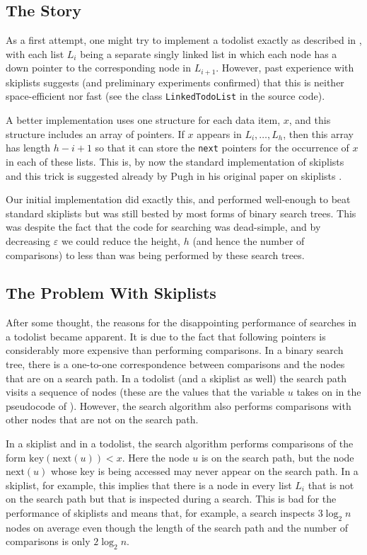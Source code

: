 \documentclass[lotsofwhite]{patmorin}
\newcommand{\eps}{\varepsilon}
\begin{document}
\subsection{The Story}

As a first attempt, one might try to implement a todolist exactly
as described in , with each list $L_i$ being a
separate singly linked list in which each node has a down pointer to
the corresponding node in $L_{i+1}$.  However, past experience with
skiplists suggests (and preliminary experiments confirmed) that this is
neither space-efficient nor fast (see the class \texttt{LinkedTodoList}
in the source code).

A better implementation uses one structure for each data item, $x$,
and this structure includes an array of pointers.  If $x$ appears in
$L_{i},\ldots,L_h$, then this array has length $h-i+1$ so that it can
store the \texttt{next} pointers for the occurrence of $x$ in each of
these lists.  This is, by now the standard implementation of skiplists
and this trick is suggested already by Pugh in his original paper on
skiplists \cite{pXX}.

Our initial implementation did exactly this, and performed well-enough
to beat standard skiplists but was still bested by most forms of binary
search trees.  This was despite the fact that the code for searching was
dead-simple, and by decreasing $\eps$ we could reduce the height, $h$
(and hence the number of comparisons) to less than was being performed
by these search trees.

\subsection{The Problem With Skiplists}

After some thought, the reasons for the disappointing performance
of searches in a todolist became apparent.  It is due to the
fact that following pointers is considerably more expensive than
performing comparisons.  In a binary search tree, there is a one-to-one
correspondence between comparisons and the nodes that are on a search
path.  In a todolist (and a skiplist as well) the search path visits a
sequence of nodes (these are the values that the variable $u$ takes on
in the pseudocode of ).  However, the search
algorithm also performs comparisons with other nodes that are not on
the search path.

In a skiplist and in a todolist, the search algorithm performs comparisons
of the form $\mathrm{key}(\mathrm{next}(u)) < x$.  Here the node $u$
is on the search path, but the node $\mathrm{next}(u)$ whose key is
being accessed may never appear on the search path.  In a skiplist,
for example, this implies that there is a node in every list $L_i$
that is not on the search path but that is inspected during a search.
This is bad for the performance of skiplists and means that, for example,
a search inspects $3\log_2 n$ nodes on average even though the length
of the search path and the number of comparisons is only $2\log_2 n$.
\end{document}
